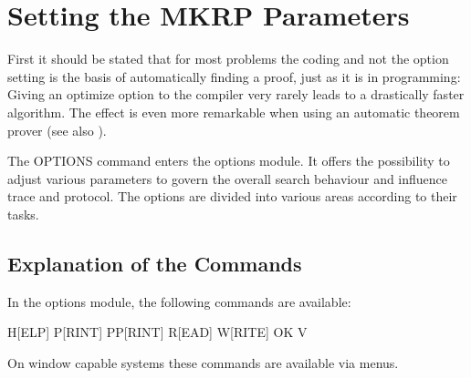 \chapter{Setting the MKRP Parameters}
\label{SettingtheMKRPParameters}


First it should be stated that for most problems the coding and not
the option setting is the basis of automatically finding a proof, just
as it is in programming: Giving an optimize option to the compiler
very rarely leads to a drastically faster algorithm. The effect is
even more remarkable when using an automatic theorem prover (see also
\cite{KePr92}).

The OPTIONS command enters the options module. It offers the
possibility to adjust various parameters to govern the overall search
behaviour and influence trace and protocol. The options are divided
into various areas according to their tasks.


\section{Explanation of the Commands}

In the options module, the following commands are available:

H[ELP]  P[RINT]  PP[RINT]  R[EAD]  W[RITE]  OK          V

On window capable systems these commands are available via menus.

